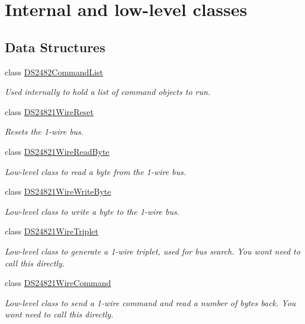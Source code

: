 \hypertarget{group___internal}{}\section{Internal and low-\/level classes}
\label{group___internal}
\subsection*{Data Structures}
\begin{DoxyCompactItemize}
\item 
class \mbox{\hyperlink{class_d_s2482_command_list}{D\+S2482\+Command\+List}}
\begin{DoxyCompactList}\small\item\em Used internally to hold a list of command objects to run. \end{DoxyCompactList}\item 
class \mbox{\hyperlink{class_d_s24821_wire_reset}{D\+S24821\+Wire\+Reset}}
\begin{DoxyCompactList}\small\item\em Resets the 1-\/wire bus. \end{DoxyCompactList}\item 
class \mbox{\hyperlink{class_d_s24821_wire_read_byte}{D\+S24821\+Wire\+Read\+Byte}}
\begin{DoxyCompactList}\small\item\em Low-\/level class to read a byte from the 1-\/wire bus. \end{DoxyCompactList}\item 
class \mbox{\hyperlink{class_d_s24821_wire_write_byte}{D\+S24821\+Wire\+Write\+Byte}}
\begin{DoxyCompactList}\small\item\em Low-\/level class to write a byte to the 1-\/wire bus. \end{DoxyCompactList}\item 
class \mbox{\hyperlink{class_d_s24821_wire_triplet}{D\+S24821\+Wire\+Triplet}}
\begin{DoxyCompactList}\small\item\em Low-\/level class to generate a 1-\/wire triplet, used for bus search. You won\textquotesingle{}t need to call this directly. \end{DoxyCompactList}\item 
class \mbox{\hyperlink{class_d_s24821_wire_command}{D\+S24821\+Wire\+Command}}
\begin{DoxyCompactList}\small\item\em Low-\/level class to send a 1-\/wire command and read a number of bytes back. You won\textquotesingle{}t need to call this directly. \end{DoxyCompactList}\item 

\end{DoxyCompactItemize}
